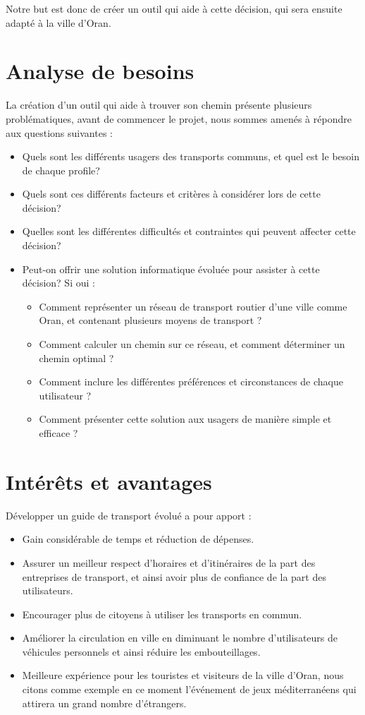 Notre but est donc de créer un outil qui aide à cette décision, qui sera ensuite adapté à la ville d'Oran.

\section{Analyse de besoins}
La création d'un outil qui aide à trouver son chemin présente plusieurs problématiques, avant de commencer le projet, nous sommes amenés à répondre aux questions suivantes :
\begin{itemize}
	\item Quels sont les différents usagers des transports communs, et quel est le besoin de chaque profile?
	\item Quels sont ces différents facteurs et critères à considérer lors de cette décision?
	\item Quelles sont les différentes difficultés et contraintes qui peuvent affecter cette décision?
	\item Peut-on offrir une solution informatique évoluée pour assister à cette décision? Si oui : 
	      \begin{itemize}
	      	\item Comment représenter un réseau de transport routier d'une ville comme Oran, et contenant plusieurs moyens de transport ?
	      	\item Comment calculer un chemin sur ce réseau, et comment déterminer un chemin optimal ?
	      	\item Comment inclure les différentes préférences et circonstances de chaque utilisateur ?
	      	\item Comment présenter cette solution aux usagers de manière simple et efficace ?
	      \end{itemize}
\end{itemize}

\section{Intérêts et avantages}
Développer un guide de transport évolué a pour apport :
\begin{itemize}
	\item Gain considérable de temps et réduction de dépenses.
	\item Assurer un meilleur respect d'horaires et d'itinéraires de la part des entreprises de transport, et ainsi avoir plus de confiance de la part des utilisateurs.
	\item Encourager plus de citoyens à utiliser les transports en commun.
	\item Améliorer la circulation en ville en diminuant le nombre d'utilisateurs de véhicules personnels et ainsi réduire les embouteillages.
	\item Meilleure expérience pour les touristes et visiteurs de la ville d'Oran, nous citons comme exemple en ce moment l'événement de jeux méditerranéens qui attirera un grand nombre d'étrangers.
\end{itemize}

